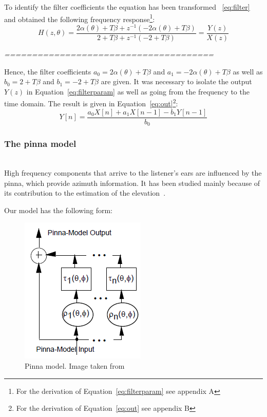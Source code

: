 \documentclass[journal]{IEEEtran}
\begin{document}
To identify the filter coefficients the equation has been transformed ~\ref{eq:filter} and obtained the following frequency response\footnote{For the derivation of Equation~\ref{eq:filterparam} see appendix A}:
\begin{equation}\label{eq:filterparam}
H\left( z,\theta\right) = \frac{2\alpha (\theta)+T\beta+z^{-1}(-2\alpha(\theta)+T\beta)}{2+T\beta+z^{-1}(-2+T\beta)} = \frac{Y(z)}{X(z)}
\end{equation} 

\emph{======================================}

Hence, the filter coefficients $a_0 = 2\alpha (\theta)+T\beta$ and $a_1 = -2\alpha(\theta)+T\beta$ as well as $b_0 = 2+T\beta$ and $b_1 = -2+T\beta$ are given. 
It was necessary to isolate the output $Y(z)$ in Equation~\ref{eq:filterparam} as well as going from the frequency to the time domain. The result is given in Equation~\ref{eq:out}\footnote{For the derivation of Equation~\ref{eq:out} see appendix B}:
\begin{equation}\label{eq:out}
Y[n] =\frac{a_0X[n]+a_1X[n-1]-b_1Y[n-1]}{b_0}
\end{equation} 

\subsubsection{The pinna model}~\\
High frequency components that arrive to the listener's ears are influenced by the pinna, which provide azimuth information. It has been studied mainly because of its contribution to the estimation of the elevation~\cite{Brown1997}.

Our model has the following form:

\begin{figure}[h!]
  \centering
    \includegraphics[scale=0.75]{graphics/pinna_part.png}
  \caption{Pinna model. Image taken from~\cite{Brown1997}}
  \label{fig:pinnaModel}
\end{figure}
\end{document}
